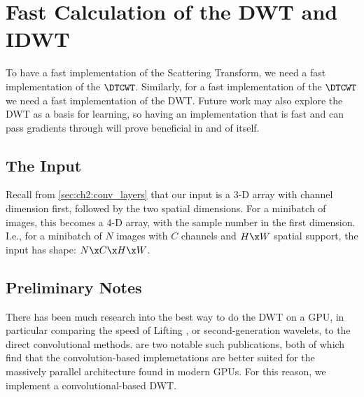 
\section{Fast Calculation of the DWT and IDWT}\label{sec:ch3:dwt}
To have a fast implementation of the Scattering Transform, we need a fast
implementation of the $\DTCWT$\@. Similarly, for a fast implementation of the $\DTCWT$ we
need a fast implementation of the DWT\@. Future work may also explore
the DWT as a basis for learning, so having an implementation that is fast and
can pass gradients through will prove beneficial in and of itself. 

\subsection{The Input}
Recall from \autoref{sec:ch2:conv_layers} that our input is a 3-D array with
channel dimension first, followed by the two spatial dimensions. For a minibatch
of images, this becomes a 4-D array, with the sample number in the first
dimension. I.e., for a minibatch of $N$ images with $C$ channels and $H\x W$ spatial support, the
input has shape: $N\x C\x H\x W$.

\subsection{Preliminary Notes}
There has been much research into the best way to do the DWT on a GPU, in
particular comparing the speed of Lifting \cite{sweldens_lifting_1998}, or
second-generation wavelets, to the direct convolutional methods.
\cite{tenllado_parallel_2008, galiano_improving_2011} are two notable such
publications, both of which find that the convolution-based implemetations are
better suited for the massively parallel architecture found in modern GPUs. For
this reason, we implement a convolutional-based DWT.

